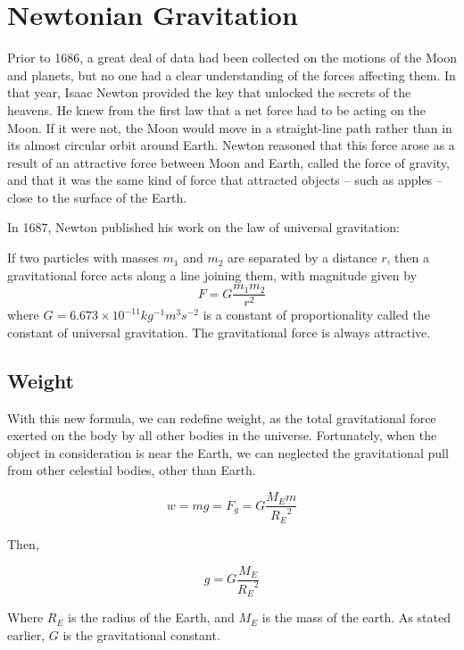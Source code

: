 \section{Newtonian Gravitation}
Prior to 1686, a great deal of data had been collected on the motions
of the Moon and planets, but no one had a clear understanding of the
forces affecting them. In that year, Isaac Newton provided the key
that unlocked the secrets of the heavens. He knew from the first law
that a net force had to be acting on the Moon. If it were not, the
Moon would move in a straight-line path rather than in its almost
circular orbit around Earth. Newton reasoned that this force arose as
a result of an attractive force between Moon and Earth, called the
force of gravity, and that it was the same kind of force that
attracted objects -- such as apples -- close to the surface of the Earth.

In 1687, Newton published his work on the law of universal gravitation:
\begin{form}
If two particles with masses $m_1$ and $m_2$ are separated by a distance $r$, then a
gravitational force acts along a line joining them, with magnitude given by
$$F=G\frac{m_1m_2}{r^2}$$
where $G=6.673 \times 10^{-11} kg^{-1} m^3 s^{-2}$ is a constant of proportionality called the constant of universal gravitation. The gravitational force is always attractive.
\end{form}

\subsection{Weight}
With this new formula, we can redefine weight, as the total gravitational force exerted on the body by all other bodies in the universe. Fortunately, when the object in consideration is near the Earth, we can neglected the gravitational pull from other celestial bodies, other than Earth.

\begin{form}
$$w = mg = F_g = G\frac{M_Em}{{R_E}^2}$$
\end{form}
Then,

\begin{form}
$$g = G\frac{M_E}{{R_E}^2}$$
\end{form}

Where $R_E$ is the radius of the Earth, and $M_E$ is the mass of the earth. As stated earlier, $G$ is the gravitational constant.

